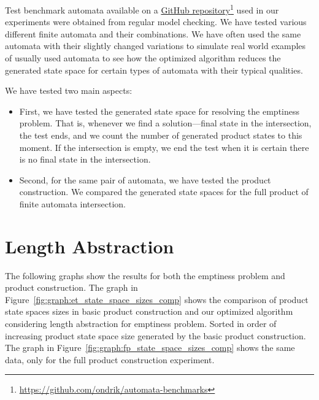 Test benchmark automata available on a \href{https://github.com/ondrik/automata-benchmarks/tree/master/nfa/non-vtf}{GitHub repository}\footnote{\url{https://github.com/ondrik/automata-benchmarks}} used in our experiments were obtained from regular model checking. We have tested various different finite automata and their combinations. We have often used the same automata with their slightly changed variations to simulate real world examples of usually used automata to see how the optimized algorithm reduces the generated state space for certain types of automata with their typical qualities.

We have tested two main aspects:
\begin{itemize}
    \item First, we have tested the generated state space for resolving the emptiness problem. That is, whenever we find a solution---final state in the intersection, the test ends, and we count the number of generated product states to this moment. If the intersection is empty, we end the test when it is certain there is no final state in the intersection.
    \item Second, for the same pair of automata, we have tested the product construction. We compared the generated state spaces for the full product of finite automata intersection.
\end{itemize}

\section{Length Abstraction}

The following graphs show the results for both the emptiness problem and product construction. The graph in Figure~\ref{fig:graph:et_state_space_sizes_comp} shows the comparison of product state spaces sizes in basic product construction and our optimized algorithm considering length abstraction for emptiness problem. Sorted in order of increasing product state space size generated by the basic product construction. The graph in Figure~\ref{fig:graph:fp_state_space_sizes_comp} shows the same data, only for the full product construction experiment.

